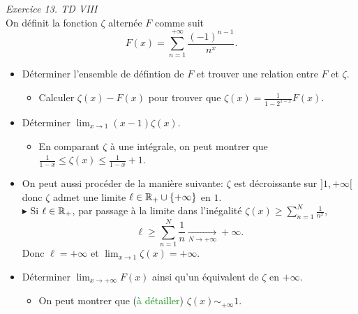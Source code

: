 \emph{Exercice 13. TD VIII}\\

On définit la fonction $\zeta$ alternée $F$ comme suit
$$\boxed{F(x) = \sum_{n=1}^{+ \infty} \frac{(-1)^{n-1}}{n^x}}.$$
\begin{itemize}
    \item Déterminer l'ensemble de défintion de $F$ et trouver une relation entre $F$ et $\zeta$.
    \begin{itemize}
        \item Calculer $\zeta(x) - F(x)$ pour trouver que $\zeta(x) = \frac{1}{1-2^{1-x}} F(x)$.
    \end{itemize}
    \item Déterminer $\displaystyle \lim_{x \to 1} (x-1) \zeta(x)$.
    \begin{itemize}
        \item En comparant $\zeta$ à une intégrale, on peut montrer que $\frac{1}{1-x} \leqslant \zeta(x) \leqslant \frac{1}{1-x} + 1$.
    \end{itemize}
    \item On peut aussi procéder de la manière suivante: $\zeta$ est décroissante sur $]1, +\infty[$ donc $\zeta$ admet une limite $\ell \in \mathbb{R}_+ \cup \{ + \infty \}$ en $1$.\\
        $\blacktriangleright$ Si $\ell \in \mathbb{R}_+$, par passage à la limite dans l'inégalité $\zeta(x) \geqslant \sum\limits_{n=1}^{N} \frac{1}{n^x}$, $$\ell \geqslant \sum\limits_{n=1}^{N} \frac{1}{n} \xrightarrow[N \to + \infty]{} +\infty.$$ 
        Donc $\ell = + \infty$ et $\displaystyle \lim_{x \to 1} \zeta(x) = +\infty$. 
    \item Déterminer $\displaystyle \lim_{x \to +\infty} F(x)$ ainsi qu'un équivalent de $\zeta$ en $+\infty$.
    \begin{itemize}
        \item On peut montrer que (\textcolor{green}{à détailler}) $\zeta(x) \sim_{+ \infty} 1$.
    \end{itemize}
\end{itemize}